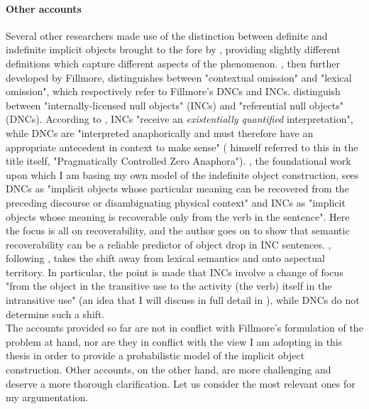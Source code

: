 \paragraph{Other accounts}
Several other researchers made use of the distinction between definite and indefinite implicit objects brought to the fore by \textcite{Fillmore1986}, providing slightly different definitions which capture different aspects of the phenomenon. \textcite{Allerton1975}, then further developed by Fillmore, distinguishes between "contextual omission" and "lexical omission", which respectively refer to Fillmore's DNCs and INCs. \textcite{CumminsRoberge2004} distinguish between "internally-licensed null objects" (INCs) and "referential null objects" (DNCs). According to \textcite[30]{PethoKardos2006}, INCs "receive an \textit{existentially quantified} interpretation", while DNCs are "interpreted anaphorically and must therefore have an appropriate antecedent in context to make sense" (\textcite{Fillmore1986} himself referred to this in the title itself, "Pragmatically Controlled Zero Anaphora"). \textcite[13]{Medina2007}, the foundational work upon which I am basing my own model of the indefinite object construction, sees DNCs as "implicit objects whose particular meaning can be recovered from the preceding discourse or disambiguating physical context" and INCs as "implicit objects whose meaning is recoverable only from the verb in the sentence". Here the focus is all on recoverability, and the author goes on to show that semantic recoverability can be a reliable predictor of object drop in INC sentences. \textcite[293]{Liu2008}, following \textcite{Garcia-VelascoMunoz2002}, takes the shift away from lexical semantics and onto aspectual territory. In particular, the point is made that INCs involve a change of focus "from the object in the transitive use to the activity (the verb) itself in the intransitive use" (an idea that I will discuss in full detail in ), while DNCs do not determine such a shift.\\
The accounts provided so far are not in conflict with Fillmore's formulation of the problem at hand, nor are they in conflict with the view I am adopting in this thesis in order to provide a probabilistic model of the implicit object construction. Other accounts, on the other hand, are more challenging and deserve a more thorough clarification. Let us consider the most relevant ones for my argumentation.\\

